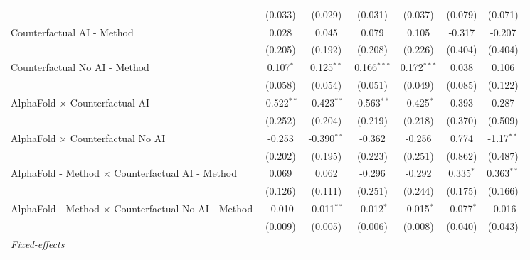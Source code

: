 \begin{tabular}{lcccccc}
                                                              & (0.033)       & (0.029)       & (0.031)       & (0.037)       & (0.079)      & (0.071)\\   
   Counterfactual AI - Method                                 & 0.028         & 0.045         & 0.079         & 0.105         & -0.317       & -0.207\\   
                                                              & (0.205)       & (0.192)       & (0.208)       & (0.226)       & (0.404)      & (0.404)\\   
   Counterfactual No AI - Method                              & 0.107$^{*}$   & 0.125$^{**}$  & 0.166$^{***}$ & 0.172$^{***}$ & 0.038        & 0.106\\   
                                                              & (0.058)       & (0.054)       & (0.051)       & (0.049)       & (0.085)      & (0.122)\\   
   AlphaFold $\times$ Counterfactual AI                       & -0.522$^{**}$ & -0.423$^{**}$ & -0.563$^{**}$ & -0.425$^{*}$  & 0.393        & 0.287\\   
                                                              & (0.252)       & (0.204)       & (0.219)       & (0.218)       & (0.370)      & (0.509)\\   
   AlphaFold $\times$ Counterfactual No AI                    & -0.253        & -0.390$^{**}$ & -0.362        & -0.256        & 0.774        & -1.17$^{**}$\\   
                                                              & (0.202)       & (0.195)       & (0.223)       & (0.251)       & (0.862)      & (0.487)\\   
   AlphaFold - Method $\times$ Counterfactual AI - Method     & 0.069         & 0.062         & -0.296        & -0.292        & 0.335$^{*}$  & 0.363$^{**}$\\   
                                                              & (0.126)       & (0.111)       & (0.251)       & (0.244)       & (0.175)      & (0.166)\\   
   AlphaFold - Method $\times$ Counterfactual No AI - Method  & -0.010        & -0.011$^{**}$ & -0.012$^{*}$  & -0.015$^{*}$  & -0.077$^{*}$ & -0.016\\   
                                                              & (0.009)       & (0.005)       & (0.006)       & (0.008)       & (0.040)      & (0.043)\\   
   \midrule
   \emph{Fixed-effects}\\

\end{tabular}
